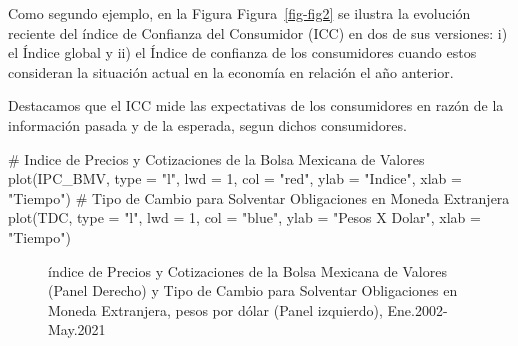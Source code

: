 \documentclass[
  a4paper,
]{article}
\newenvironment{Shaded}{}{}
\newcommand{\AttributeTok}[1]{\textcolor[rgb]{0.84,0.23,0.29}{#1}}
\newcommand{\CommentTok}[1]{\textcolor[rgb]{0.42,0.45,0.49}{#1}}
\newcommand{\DecValTok}[1]{\textcolor[rgb]{0.00,0.36,0.77}{#1}}
\newcommand{\FunctionTok}[1]{\textcolor[rgb]{0.44,0.26,0.76}{#1}}
\newcommand{\NormalTok}[1]{\textcolor[rgb]{0.14,0.16,0.18}{#1}}
\newcommand{\StringTok}[1]{\textcolor[rgb]{0.01,0.18,0.38}{#1}}
\begin{document}
Como segundo ejemplo, en la Figura Figura~\ref{fig-fig2} se ilustra la
evolución reciente del índice de Confianza del Consumidor (ICC) en dos
de sus versiones: i) el Índice global y ii) el Índice de confianza de
los consumidores cuando estos consideran la situación actual en la
economía en relación el año anterior.

Destacamos que el ICC mide las expectativas de los consumidores en razón
de la información pasada y de la esperada, segun dichos consumidores.

\begin{Shaded}
\begin{Highlighting}[]
\CommentTok{\# Indice de Precios y Cotizaciones de la Bolsa Mexicana de Valores}
\FunctionTok{plot}\NormalTok{(IPC\_BMV, }\AttributeTok{type =} \StringTok{"l"}\NormalTok{, }\AttributeTok{lwd =} \DecValTok{1}\NormalTok{, }\AttributeTok{col =} \StringTok{"red"}\NormalTok{, }\AttributeTok{ylab =} \StringTok{"Indice"}\NormalTok{, }\AttributeTok{xlab =} \StringTok{"Tiempo"}\NormalTok{)}
\CommentTok{\# Tipo de Cambio para Solventar Obligaciones en Moneda Extranjera}
\FunctionTok{plot}\NormalTok{(TDC, }\AttributeTok{type =} \StringTok{"l"}\NormalTok{, }\AttributeTok{lwd =} \DecValTok{1}\NormalTok{, }\AttributeTok{col =} \StringTok{"blue"}\NormalTok{, }\AttributeTok{ylab =} \StringTok{"Pesos X Dolar"}\NormalTok{, }\AttributeTok{xlab =} \StringTok{"Tiempo"}\NormalTok{)}
\end{Highlighting}
\end{Shaded}

\begin{figure}

\caption{\label{fig-fig3}índice de Precios y Cotizaciones de la Bolsa
Mexicana de Valores (Panel Derecho) y Tipo de Cambio para Solventar
Obligaciones en Moneda Extranjera, pesos por dólar (Panel izquierdo),
Ene.2002-May.2021}

\begin{minipage}{0.50\linewidth}



\end{minipage}%
%
\begin{minipage}{0.50\linewidth}



\end{minipage}%

\end{figure}%
\end{document}
